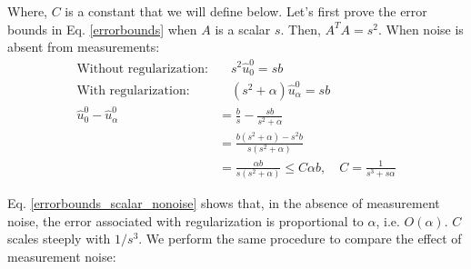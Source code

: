 \documentclass[]{article}
\begin{document}
Where, $C$ is a constant that we will define below. Let's first prove the error bounds in Eq. \ref{errorbounds} when $A$ is a scalar $s$. Then, $A^{T}A = s^{2}$. When noise is absent from measurements:
\begin{align}
\textrm{Without regularization:} &\quad s^2 \hat{u}_{0}^{0} = sb \\
\textrm{With regularization:} &\quad (s^{2}+\alpha)\hat{u}_{\alpha}^{0} = sb \\
\hat{u}_{0}^{0} - \hat{u}_{\alpha}^{0} &= \frac{b}{s} - \frac{sb}{s^{2}+\alpha} \nonumber \\
&= \frac{b(s^{2}+\alpha)-s^{2}b}{s(s^{2}+\alpha)} \nonumber \\
&= \frac{\alpha b}{s(s^{2}+\alpha)} \leq C \alpha b, \quad C = \frac{1}{s^{3} + s\alpha} \label{errorbounds_scalar_nonoise}
\end{align}

Eq. \ref{errorbounds_scalar_nonoise} shows that, in the absence of measurement noise, the error associated with regularization is proportional to $\alpha$, i.e. $O(\alpha)$. $C$ scales steeply with $1/s^{3}$. We perform the same procedure to compare the effect of measurement noise:
\end{document}
